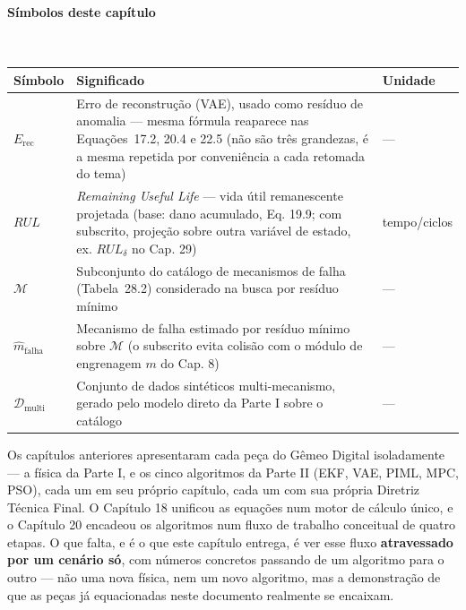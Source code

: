 \documentclass[12pt,a4paper]{article}
\numberwithin{equation}{section}
\numberwithin{table}{section}
\numberwithin{figure}{section}
\begin{document}
{\paragraph{Símbolos deste capítulo}\mbox{}\\[-0.5em]
{\small
\begin{longtable}{>{\raggedright\arraybackslash}p{2.6cm} >{\raggedright\arraybackslash}p{9.2cm} >{\raggedright\arraybackslash}p{2.6cm}}
	\toprule
	\textbf{Símbolo} & \textbf{Significado} & \textbf{Unidade} \\ \midrule
	\endhead
	$E_{\text{rec}}$ & Erro de reconstrução (VAE), usado como resíduo de anomalia — mesma fórmula reaparece nas Equações~17.2, 20.4 e 22.5 (não são três grandezas, é a mesma repetida por conveniência a cada retomada do tema) & --- \\
	$RUL$ & \textit{Remaining Useful Life} — vida útil remanescente projetada (base: dano acumulado, Eq. 19.9; com subscrito, projeção sobre outra variável de estado, ex. $RUL_\delta$ no Cap. 29) & tempo/ciclos \\
	$\mathcal{M}$ & Subconjunto do catálogo de mecanismos de falha (Tabela~28.2) considerado na busca por resíduo mínimo & --- \\
	$\hat{m}_{\text{falha}}$\dag & Mecanismo de falha estimado por resíduo mínimo sobre $\mathcal{M}$ (o subscrito evita colisão com o módulo de engrenagem $m$ do Cap. 8) & --- \\
	$\mathcal{D}_{\text{multi}}$ & Conjunto de dados sintéticos multi-mecanismo, gerado pelo modelo direto da Parte I sobre o catálogo & --- \\
	\bottomrule
\end{longtable}
}






Os capítulos anteriores apresentaram cada peça do Gêmeo Digital isoladamente — a física da Parte I, e os cinco algoritmos da Parte II (EKF, VAE, PIML, MPC, PSO), cada um em seu próprio capítulo, cada um com sua própria Diretriz Técnica Final. O Capítulo 18 unificou as equações num motor de cálculo único, e o Capítulo 20 encadeou os algoritmos num fluxo de trabalho conceitual de quatro etapas. O que falta, e é o que este capítulo entrega, é ver esse fluxo \textbf{atravessado por um cenário só}, com números concretos passando de um algoritmo para o outro — não uma nova física, nem um novo algoritmo, mas a demonstração de que as peças já equacionadas neste documento realmente se encaixam.

}
\end{document}
